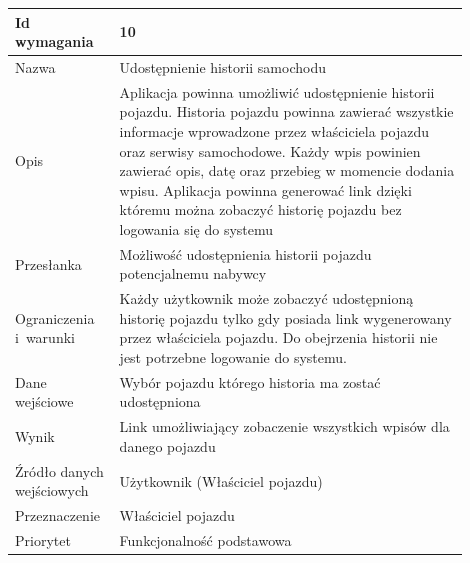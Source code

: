 \documentclass[12pt]{article}
\begin{document}
\begin{table}[H]
\begin{center}
	\begin{tabular}{|p{0.18\linewidth}|p{0.72\linewidth}|}%
	\hline
	Id wymagania 	& 10 				\\ \hline
	Nazwa			& Udostępnienie historii samochodu \\ \hline
	Opis &	Aplikacja powinna umożliwić udostępnienie historii pojazdu. Historia pojazdu powinna zawierać wszystkie informacje wprowadzone przez właściciela pojazdu oraz serwisy samochodowe. Każdy wpis powinien zawierać opis, datę oraz przebieg w momencie dodania wpisu. Aplikacja powinna generować link dzięki któremu można zobaczyć historię pojazdu bez logowania się do systemu \\ \hline
	Przesłanka & Możliwość udostępnienia historii pojazdu potencjalnemu nabywcy   \\ \hline
	Ograniczenia i~warunki & Każdy użytkownik może zobaczyć udostępnioną historię pojazdu tylko gdy posiada link wygenerowany przez właściciela pojazdu. Do obejrzenia historii nie jest potrzebne logowanie do systemu. \\ \hline
	Dane wejściowe &Wybór pojazdu którego historia ma zostać udostępniona \\ \hline
	Wynik & Link umożliwiający zobaczenie wszystkich wpisów dla danego pojazdu\\ \hline
	Źródło danych wejściowych &Użytkownik (Właściciel pojazdu)\\ \hline
	Przeznaczenie & Właściciel pojazdu\\ \hline
	Priorytet & Funkcjonalność podstawowa \\ \hline
	\end{tabular}
\end{center}
\end{table}
\end{document}
